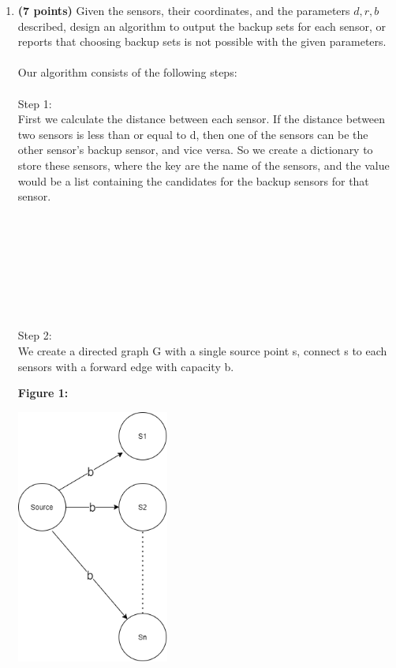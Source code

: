 \documentclass{assignment-373}
\begin{document}
\begin{enumerate}
\item \textbf{(7 points)} Given the sensors, their coordinates, and the parameters $d, r, b$ described, design an algorithm to output the backup sets for each sensor, or reports that choosing backup sets is not possible with the given parameters.\\\\
    Our algorithm consists of the following steps:\\\\
    Step 1:\\
    \phantom{=} \phantom{=} First we calculate the distance between each sensor. If the distance between two sensors is less than or equal to d, then one of the sensors can be the other sensor's backup sensor, and vice versa. So we create a dictionary to store these sensors, where the key are the name of the sensors, and the value would be a list containing the candidates for the backup sensors for that sensor.\\\\
    \\
    \\
    \\
    \\
    \\
    \\
    \\
    Step 2:\\
    \phantom{=} \phantom{=} We create a directed graph G with a single source point s, connect s to each sensors with a forward edge with capacity b.\\
    \begin{center}
	    \textbf{Figure 1:}
	\end{center}
    \begin{center}
    \includegraphics[width=5cm]{./g1.png}

\end{center}
\end{enumerate}
\end{document}
